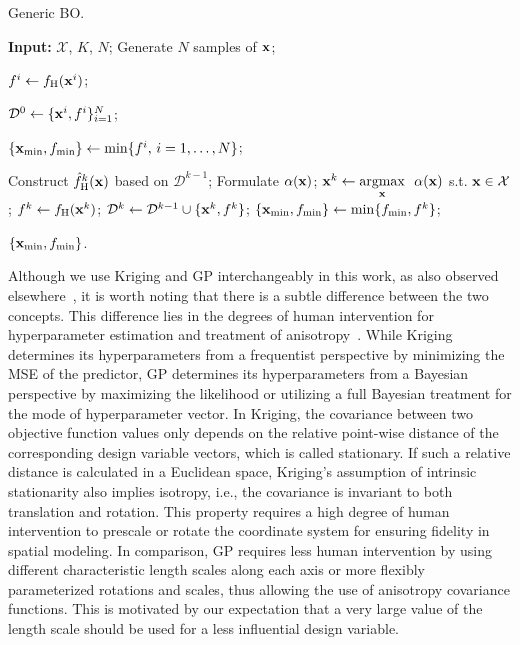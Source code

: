 \documentclass[journal ]{new-aiaa}
\newcommand{\edit}[1]{\textcolor{red}{#1}} %
\begin{document}
\begin{algorithm}
	\caption{Generic BO.}\label{Algo1}
	\begin{algorithmic}[1]
		\State \textbf{Input:} $\mathcal{X}$, $K$, $N$; \label{Algo1:1}
		\State Generate $N$ samples of ${\bf x}$; 
		
		\State $f^i \gets f_\text{H}({\bf x}^i)$; \textcolor{black}{}
		\EndFor
		
		\State $\mathcal{D}^0 \gets \{{\bf x}^i,f^i\}_{i=1}^N$; \label{Algo1:6}
		
		\State $\{{\bf x}_{\min},f_{\min}\} \gets \min\{f^i,\, i=1,\dots, N\}$;
		
		\State Construct $\hat{f}_\text{H}^k({\bf x})$ based on $\mathcal{D}^{k-1}$; \label{Algo1:9}
		\State Formulate $\alpha({\bf x})$; \label{Algo1:10}
		\State ${\bf x}^{k} \gets \underset{{\bf x}}{\mathrm{argmax}} \ \ \alpha({\bf x})$ s.t. ${\bf x} \in \mathcal{X}$; \label{Algo1:11}
		\State $f^{k} \gets f_\text{H}({\bf x}^{k})$;
		\textcolor{black}{} \label{Algo1:12}
		\State $\mathcal{D}^k\gets\mathcal{D}^{k-1} \cup \{{\bf x}^{k},f^{k}\}$; \label{Algo1:13}
		\State $\{{\bf x}_{\min},f_{\min}\} \gets \min\{f_{\min},f^{k}\}$;
		\EndFor
		
		\State \Return $\{{\bf x}_{\min},f_{\min}\}$.
	\end{algorithmic}
\end{algorithm}

Although we use Kriging and GP interchangeably in this work, as also observed elsewhere~\citep[see e.g.,][]{Forrester2008,Erickson2018}, it is worth noting that there is a subtle difference between the two concepts.
This difference lies in the degrees of human intervention for hyperparameter estimation and treatment of anisotropy~\citep{Christianson2023}.
While Kriging determines its hyperparameters from a frequentist perspective by minimizing the MSE of the predictor, GP determines its hyperparameters from a Bayesian perspective by maximizing the likelihood or utilizing a full Bayesian treatment for the mode of hyperparameter vector.
In Kriging, the covariance between two objective function values only depends on the relative point-wise distance of the corresponding design variable vectors, which is called stationary.
If such a relative distance is calculated in a Euclidean space, Kriging's assumption of intrinsic stationarity also implies isotropy, i.e., the covariance is invariant to both translation and rotation.
This property requires a high degree of human intervention to prescale or rotate the coordinate system for ensuring fidelity in spatial modeling.
In comparison, GP requires less human intervention by using different characteristic length scales along each axis or more flexibly parameterized rotations and scales, thus allowing the use of anisotropy covariance functions.
{This is motivated by our expectation that a very large value of the length scale should be used for a less influential design variable.}
\end{document}
